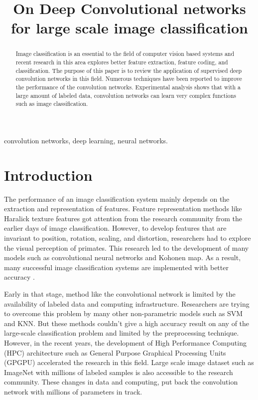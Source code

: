 \documentclass[a4paper]{article}
\title { On Deep Convolutional networks for large scale image classification}
\begin{document}
\topmargin=0mm 
%
\maketitle
%
\begin{abstract}
Image classification is an essential to the field of computer vision  based systems and recent research in this area explores better feature extraction, feature coding, and classification.  The purpose of this paper is to review the application of supervised  deep convolution networks in this field. Numerous techniques have been reported to improve the performance of the convolution networks. Experimental analysis shows that with a large amount of labeled data, convolution networks can learn very complex functions such as image classification. 



\end{abstract}
%
\begin{keywords}
convolution networks, deep learning, neural networks.
\end{keywords}
%
\section{Introduction}
\label{sec:intro}
The performance of an  image  classification system mainly depends on the  extraction and  representation of features.  Feature representation methods like Haralick texture features \cite{Haralick1973} got attention from the research community from the earlier days of  image classification. However, to develop features that are invariant to position, rotation, scaling, and distortion, researchers had  to  explore the visual perception of primates. This research  led to  the development of many models such as convolutional neural networks\cite{LeCun1998} and  Kohonen map\cite{kohonen1982self}. 
As a result, many successful image classification systems are  implemented with better accuracy \cite{lecun-89e}.

Early in that stage, method like the convolutional network is limited by the  availability of labeled  data and computing infrastructure. Researchers are trying to overcome  this problem by many other non-parametric models such as SVM and KNN. But these methods couldn't give a high accuracy result  on any of the large-scale classification problem  and limited by the preprocessing technique.  However, in the recent years, the development of  High Performance Computing (HPC) architecture such as General Purpose Graphical Processing Units (GPGPU)  accelerated the research in this field. Large scale image  dataset such as ImageNet \cite{imagenet}  with  millions of labeled samples is also accessible to the research community. These changes in data and computing, put back the convolution network with millions of parameters in track. 
\end{document}
